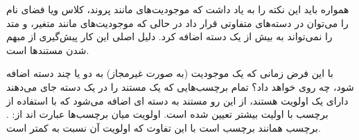 \begin{note}
همواره باید این نکته را به یاد داشت که موجودیت‌های مانند پروند، کلاس ویا فضای
نام را می‌توان در دسته‌های متفاوتی قرار داد در حالی که موجودیت‌های مانند
متغیر، و متد را نمی‌تواند به بیش از یک دسته اضافه کرد. دلیل اصلی این کار پیش‌گیری از
مبهم شدن مستندها است.

با این فرض زمانی که یک موجودیت (به صورت غیرمجاز) به دو یا چند دسته اضافه شود، چه
روی خواهد داد؟ تمام برچسب‌هایی که یک مستند را در یک دسته جای می‌دهند دارای یک
اولویت هستند، از این رو مستند به دسته ای اضافه می‌شود که با استفاده از برچسب با
اولیت بیشتر تعیین شده است. اولویت میان برچسب‌ها عبارت اند از: 
   .
برچسب  همانند برچسب  است با این تفاوت که اولویت آن
نسبت به  کمتر است.

\end{note}

